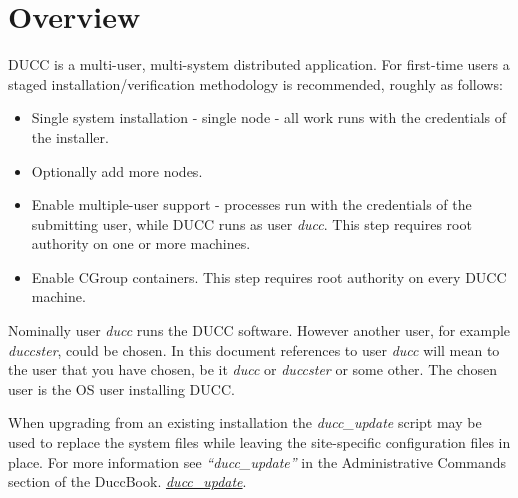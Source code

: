 % 
% 
% 
% 
\section{Overview}

DUCC is a multi-user, multi-system distributed application.
For first-time users a staged installation/verification methodology is recommended,
roughly as follows:

\begin{itemize}
    \item Single system installation - single node - all work runs with the credentials of the installer.
      
    \item Optionally add more nodes. 
      
    \item Enable multiple-user support - processes run with the credentials of the submitting user,
      while DUCC runs as user {\em ducc}.
      This step requires root authority on one or more machines.
      
    \item Enable CGroup containers. This step requires root authority on every DUCC machine.
\end{itemize}

Nominally user {\em ducc} runs the DUCC software.  However another user, for example 
{\em duccster}, could be chosen.  In this document references to user {\em ducc} will mean 
to the user that you have chosen, be it {\em ducc} or {\em duccster} or some other.
The chosen user is the OS user installing DUCC.

When upgrading from an existing installation the {\em ducc\_update} script may be used
to replace the system files while leaving the site-specific configuration files in place. 
For more information see
\ifdefined\DUCCSTANDALONE
{\em ``ducc\_update''} in the Administrative Commands section of the DuccBook. 
\else
\hyperref[subsec:admin.ducc-update] {\em ducc\_update}. 
\fi


